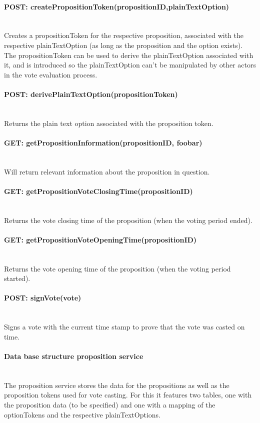 \paragraph*{POST: createPropositionToken(propositionID,plainTextOption)} \mbox{} \\
Creates a propositionToken for the respective proposition, associated with the respective plainTextOption (as long as the proposition and the option exists). The propositionToken can be used to derive the plainTextOption associated with it, and is introduced so the plainTextOption can't be manipulated by other actors in the vote evaluation process.

\paragraph*{POST: derivePlainTextOption(propositionToken)} \mbox{} \\
Returns the plain text option associated with the proposition token.


\paragraph*{GET: getPropositionInformation(propositionID, foobar)} \mbox{} \\
Will return relevant information about the proposition in question.

\paragraph*{GET: getPropositionVoteClosingTime(propositionID)} \mbox{} \\
Returns the vote closing time of the proposition (when the voting period ended).

\paragraph*{GET: getPropositionVoteOpeningTime(propositionID)} \mbox{} \\
Returns the vote opening time of the proposition (when the voting period started).

\paragraph*{POST: signVote(vote)} \mbox{} \\
Signs a vote with the current time stamp to prove that the vote was casted on time. 

\paragraph*{Data base structure proposition service} \mbox{} \\
The proposition service stores the data for the propositions as well as the proposition tokens used for vote casting. For this it features two tables, one with the proposition data (to be specified) and one with a mapping of the optionTokens and the respective plainTextOptions.
